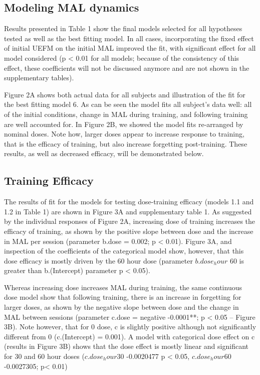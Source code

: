 \subsection{Modeling MAL dynamics}
Results presented in Table 1 show the final models selected for all hypotheses tested as well as the best fitting model. 
In all cases, incorporating the fixed effect of initial UEFM on the initial MAL improved the fit, with significant effect for all model considered (p < 0.01 for all models; because of the consistency of this effect, these coefficients will not be discussed anymore and are not shown in the supplementary tables).

Figure 2A shows both actual data for all subjects and illustration of the fit for the best fitting model 6. 
As can be seen the model fits all subject’s data well: all of the initial conditions, change in MAL during training, and following training are well accounted for. 
In Figure 2B, we showed the model fits re-arranged by nominal doses. 
Note how, larger doses appear to increase response to training, that is the efficacy of training, but also increase forgetting post-training. 
These results, as well as decreased efficacy, will be demonstrated below.

\subsection{Training Efficacy}
The results of fit for the models for testing dose-training efficacy (models 1.1 and 1.2 in Table 1) are shown in Figure 3A and supplementary table 1. 
As suggested by the individual responses of Figure 2A, increasing dose of training increases the efficacy of training, as shown by the positive slope between dose and the increase in MAL per session (parameter b.dose = 0.002; p < 0.01). 
Figure 3A, and inspection of the coefficients of the categorical model show, however, that this dose efficacy is mostly driven by the 60 hour dose (parameter $ b.dose_hour $ 60 is greater than b.(Intercept) parameter p < 0.05).

Whereas increasing dose increases MAL during training, the same continuous dose model show that following training, there is an increase in forgetting for larger doses, as shown by the negative slope between dose and the change in MAL between sessions (parameter c.dose =  negative  -0.0001**; p < 0.05 – Figure 3B). 
Note however, that for 0 dose, c is slightly positive although not significantly different from 0 (c.(Intercept) = 0.001). A model with categorical dose effect on c (results in Figure 3B) shows that the dose effect is mostly linear and significant for 30 and 60 hour doses ($ c.dose_hour30 $  -0.0020477 p <  0.05,  $ c.dose_hour60 $  -0.0027305; p<  0.01)

